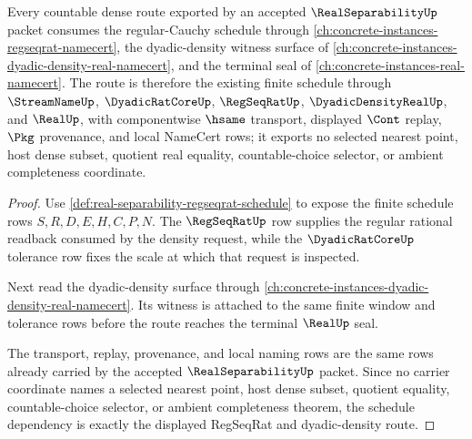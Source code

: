 \begin{theorem}
\label{thm:real-separability-regseqrat-schedule-dependency}
Every countable dense route exported by an accepted $\RealSeparabilityUp$ packet consumes the regular-Cauchy schedule through \autoref{ch:concrete-instances-regseqrat-namecert}, the dyadic-density witness surface of \autoref{ch:concrete-instances-dyadic-density-real-namecert}, and the terminal seal of \autoref{ch:concrete-instances-real-namecert}. The route is therefore the existing finite schedule through $\StreamNameUp$, $\DyadicRatCoreUp$, $\RegSeqRatUp$, $\DyadicDensityRealUp$, and $\RealUp$, with componentwise $\hsame$ transport, displayed $\Cont$ replay, $\Pkg$ provenance, and local NameCert rows; it exports no selected nearest point, host dense subset, quotient real equality, countable-choice selector, or ambient completeness coordinate.
\end{theorem}
\begin{proof}
Use \autoref{def:real-separability-regseqrat-schedule} to expose the finite schedule rows $S,R,D,E,H,C,P,N$. The $\RegSeqRatUp$ row supplies the regular rational readback consumed by the density request, while the $\DyadicRatCoreUp$ tolerance row fixes the scale at which that request is inspected.

Next read the dyadic-density surface through \autoref{ch:concrete-instances-dyadic-density-real-namecert}. Its witness is attached to the same finite window and tolerance rows before the route reaches the terminal $\RealUp$ seal.

The transport, replay, provenance, and local naming rows are the same rows already carried by the accepted $\RealSeparabilityUp$ packet. Since no carrier coordinate names a selected nearest point, host dense subset, quotient equality, countable-choice selector, or ambient completeness theorem, the schedule dependency is exactly the displayed RegSeqRat and dyadic-density route.
\end{proof}
